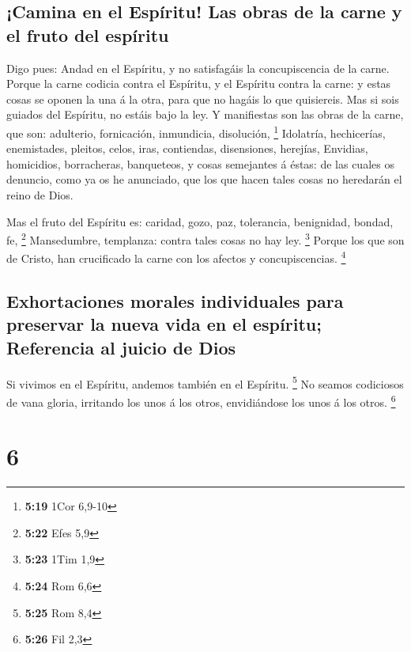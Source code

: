 \hypertarget{camina-en-el-espuxedritu-las-obras-de-la-carne-y-el-fruto-del-espuxedritu}{%
\subsection{¡Camina en el Espíritu! Las obras de la carne y el fruto del
espíritu}\label{camina-en-el-espuxedritu-las-obras-de-la-carne-y-el-fruto-del-espuxedritu}}

 Digo pues: Andad en el Espíritu, y no satisfagáis la
concupiscencia de la carne.  Porque la carne codicia contra
el Espíritu, y el Espíritu contra la carne: y estas cosas se oponen la
una á la otra, para que no hagáis lo que quisiereis.  Mas
si sois guiados del Espíritu, no estáis bajo la ley.  Y
manifiestas son las obras de la carne, que son: adulterio, fornicación,
inmundicia, disolución, \footnote{\textbf{5:19} 1Cor 6,9-10}
 Idolatría, hechicerías, enemistades, pleitos, celos, iras,
contiendas, disensiones, herejías,  Envidias, homicidios,
borracheras, banqueteos, y cosas semejantes á éstas: de las cuales os
denuncio, como ya os he anunciado, que los que hacen tales cosas no
heredarán el reino de Dios.

 Mas el fruto del Espíritu es: caridad, gozo, paz,
tolerancia, benignidad, bondad, fe, \footnote{\textbf{5:22} Efes 5,9}
 Mansedumbre, templanza: contra tales cosas no hay ley.
\footnote{\textbf{5:23} 1Tim 1,9}  Porque los que son de
Cristo, han crucificado la carne con los afectos y concupiscencias.
\footnote{\textbf{5:24} Rom 6,6}

\hypertarget{exhortaciones-morales-individuales-para-preservar-la-nueva-vida-en-el-espuxedritu-referencia-al-juicio-de-dios}{%
\subsection{Exhortaciones morales individuales para preservar la nueva
vida en el espíritu; Referencia al juicio de
Dios}\label{exhortaciones-morales-individuales-para-preservar-la-nueva-vida-en-el-espuxedritu-referencia-al-juicio-de-dios}}

 Si vivimos en el Espíritu, andemos también en el Espíritu.
\footnote{\textbf{5:25} Rom 8,4}  No seamos codiciosos de
vana gloria, irritando los unos á los otros, envidiándose los unos á los
otros. \footnote{\textbf{5:26} Fil 2,3}

\hypertarget{section-5}{%
\section{6}\label{section-5}}

